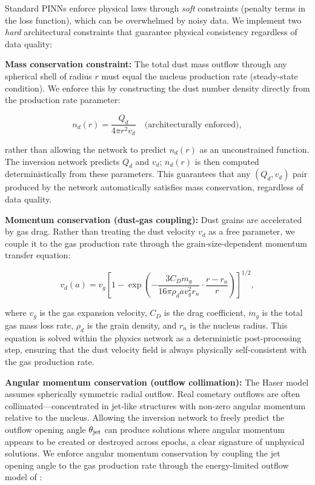 \documentclass[preprint2]{aastex631}
\begin{document}
Standard PINNs enforce physical laws through \textit{soft} constraints (penalty terms in the loss function), which can be overwhelmed by noisy data. We implement two \textit{hard} architectural constraints that guarantee physical consistency regardless of data quality:

\textbf{Mass conservation constraint:} The total dust mass outflow through any spherical shell of radius $r$ must equal the nucleus production rate (steady-state condition). We enforce this by constructing the dust number density directly from the production rate parameter:

\begin{equation}\label{eq:hard_mass}
n_d(r) = \frac{Q_d}{4\pi r^2 v_d} \quad \text{(architecturally enforced)},
\end{equation}

rather than allowing the network to predict $n_d(r)$ as an unconstrained function. The inversion network predicts $Q_d$ and $v_d$; $n_d(r)$ is then computed deterministically from these parameters. This guarantees that any $(Q_d, v_d)$ pair produced by the network automatically satisfies mass conservation, regardless of data quality.

\textbf{Momentum conservation (dust-gas coupling):} Dust grains are accelerated by gas drag. Rather than treating the dust velocity $v_d$ as a free parameter, we couple it to the gas production rate through the grain-size-dependent momentum transfer equation:

\begin{equation}\label{eq:hard_momentum}
v_d(a) = v_g \left[1 - \exp\left(-\frac{3 C_D \dot{m}_g}{16 \pi \rho_d a v_g^2 r_n} \cdot \frac{r - r_n}{r}\right)\right]^{1/2},
\end{equation}

where $v_g$ is the gas expansion velocity, $C_D$ is the drag coefficient, $\dot{m}_g$ is the total gas mass loss rate, $\rho_d$ is the grain density, and $r_n$ is the nucleus radius. This equation is solved within the physics network as a deterministic post-processing step, ensuring that the dust velocity field is always physically self-consistent with the gas production rate.

\textbf{Angular momentum conservation (outflow collimation):} The Haser model assumes spherically symmetric radial outflow. Real cometary outflows are often collimated---concentrated in jet-like structures with non-zero angular momentum relative to the nucleus. Allowing the inversion network to freely predict the outflow opening angle $\theta_{\rm jet}$ can produce solutions where angular momentum appears to be created or destroyed across epochs, a clear signature of unphysical solutions. We enforce angular momentum conservation by coupling the jet opening angle to the gas production rate through the energy-limited outflow model of \citet{belton07}:
\end{document}
